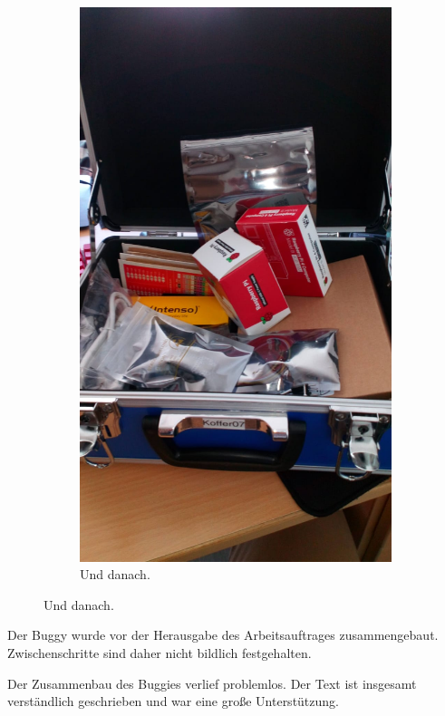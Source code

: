 \documentclass[12pt,twoside]{report}
\begin{document}
\begin{figure}[h!]
\begin{subfigure}{0.45\linewidth}
    \includegraphics[width=\linewidth]{lernportfolio_assets/Buggy_Koffer.jpeg}
    \caption{Und danach.}
  \end{subfigure}
\end{figure}

Der Buggy wurde vor der Herausgabe des Arbeitsauftrages zusammengebaut. Zwischenschritte sind daher nicht bildlich festgehalten. 

Der Zusammenbau des Buggies verlief problemlos. Der Text ist insgesamt verständlich geschrieben und war eine große Unterstützung.
\end{document}
